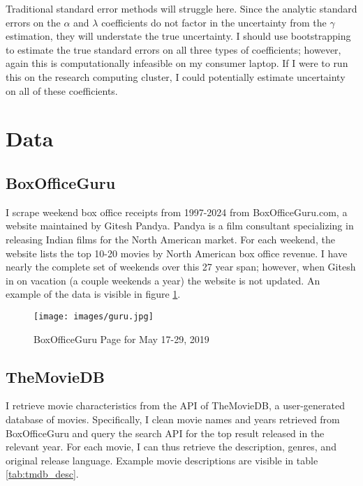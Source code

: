 \documentclass{article}
\begin{document}
Traditional standard error methods will struggle here. Since the analytic standard errors on the $\alpha$ and $\lambda$ coefficients do not factor in the uncertainty from the $\gamma$ estimation, they will understate the true uncertainty. I should use bootstrapping to estimate the true standard errors on all three types of coefficients; however, again this is computationally infeasible on my consumer laptop. If I were to run this on the research computing cluster, I could potentially estimate uncertainty on all of these coefficients. 


\section{Data}

\subsection{BoxOfficeGuru}

I scrape weekend box office receipts from 1997-2024 from BoxOfficeGuru.com, a website maintained by Gitesh Pandya. Pandya is a film consultant specializing in releasing Indian films for the North American market. For each weekend, the website lists the top 10-20 movies by North American box office revenue. I have nearly the complete set of weekends over this 27 year span; however, when Gitesh in on vacation (a couple weekends a year) the website is not updated. An example of the data is visible in figure \ref{fig:guru}.

\begin{figure}
    \texttt{[image: images/guru.jpg]}
    \caption{BoxOfficeGuru Page for May 17-29, 2019}
    \label{fig:guru}
\end{figure}


\subsection{TheMovieDB}

I retrieve movie characteristics from the API of TheMovieDB, a user-generated database of movies. Specifically, I clean movie names and years retrieved from BoxOfficeGuru and query the search API for the top result released in the relevant year. For each movie, I can thus retrieve the description, genres, and original release language. Example movie descriptions are visible in table \ref{tab:tmdb_desc}.
\end{document}
